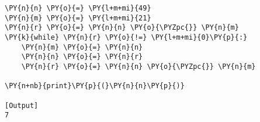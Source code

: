 \begin{Verbatim}[label=\makebox{\href{https://github.com/unipi-physics-labs/lab1-notes/tree/main/snippy/euclid_algorithm.py}{https://github.com/.../euclid\_algorithm.py}},commandchars=\\\{\}]
\PY{n}{n} \PY{o}{=} \PY{l+m+mi}{49}
\PY{n}{m} \PY{o}{=} \PY{l+m+mi}{21}
\PY{n}{r} \PY{o}{=} \PY{n}{n} \PY{o}{\PYZpc{}} \PY{n}{m}
\PY{k}{while} \PY{n}{r} \PY{o}{!=} \PY{l+m+mi}{0}\PY{p}{:}
    \PY{n}{m} \PY{o}{=} \PY{n}{n}
    \PY{n}{n} \PY{o}{=} \PY{n}{r}
    \PY{n}{r} \PY{o}{=} \PY{n}{n} \PY{o}{\PYZpc{}} \PY{n}{m}

\PY{n+nb}{print}\PY{p}{(}\PY{n}{n}\PY{p}{)}

[Output]
7
\end{Verbatim}
